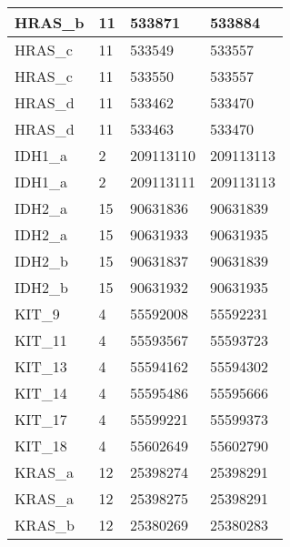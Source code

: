 \begin{longtable}{| p{} | C{.10\textwidth} | C{.35\textwidth} | C{.35\textwidth} |}
HRAS\_b                 & 11           & 533871                & 533884              \\ \hline
HRAS\_c                 & 11           & 533549                & 533557              \\ \hline
HRAS\_c                 & 11           & 533550                & 533557              \\ \hline
HRAS\_d                 & 11           & 533462                & 533470              \\ \hline
HRAS\_d                 & 11           & 533463                & 533470              \\ \hline
IDH1\_a                 & 2            & 209113110             & 209113113           \\ \hline
IDH1\_a                 & 2            & 209113111             & 209113113           \\ \hline
IDH2\_a                 & 15           & 90631836              & 90631839            \\ \hline
IDH2\_a                 & 15           & 90631933              & 90631935            \\ \hline
IDH2\_b                 & 15           & 90631837              & 90631839            \\ \hline
IDH2\_b                 & 15           & 90631932              & 90631935            \\ \hline
KIT\_9                  & 4            & 55592008              & 55592231            \\ \hline
KIT\_11                 & 4            & 55593567              & 55593723            \\ \hline
KIT\_13                 & 4            & 55594162              & 55594302            \\ \hline
KIT\_14                 & 4            & 55595486              & 55595666            \\ \hline
KIT\_17                 & 4            & 55599221              & 55599373            \\ \hline
KIT\_18                 & 4            & 55602649              & 55602790            \\ \hline
KRAS\_a                 & 12           & 25398274              & 25398291            \\ \hline
KRAS\_a                 & 12           & 25398275              & 25398291            \\ \hline
KRAS\_b                 & 12           & 25380269              & 25380283            \\ \hline

\end{longtable}
